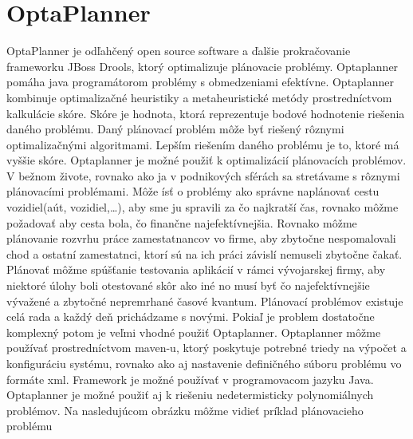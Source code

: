 \chapter{OptaPlanner}
OptaPlanner je odľahčený open source software a ďalšie prokračovanie frameworku JBoss Drools, ktorý optimalizuje plánovacie problémy. Optaplanner pomáha java programátorom problémy s obmedzeniami efektívne. Optaplanner kombinuje optimalizačné heuristiky a metaheuristické metódy prostredníctvom kalkulácie skóre. Skóre je hodnota, ktorá reprezentuje bodové hodnotenie riešenia daného problému. Daný plánovací problém môže byť riešený rôznymi optimalizačnými algoritmami. Lepším riešením daného problému je to, ktoré má vyššie skóre. Optaplanner je možné použiť k optimalizácií plánovacích problémov. V bežnom živote, rovnako ako ja v podnikových sférách sa stretávame s rôznymi plánovacími problémami. Môže ísť o problémy ako správne naplánovať cestu vozidiel(aút, vozidiel,\ldots), aby sme ju spravili za čo najkratší čas, rovnako môžme požadovať aby cesta bola, čo finančne najefektívnejšia. Rovnako môžme plánovanie rozvrhu práce zamestatnancov vo firme, aby zbytočne nespomalovali chod a ostatní zamestatnci, ktorí sú na ich práci závislí nemuseli zbytočne čakať. Plánovať môžme spúšťanie testovania aplikácií v rámci vývojarskej firmy, aby niektoré úlohy boli otestované skôr ako iné no musí byť čo najefektívnejšie vývažené a zbytočné nepremrhané časové kvantum. Plánovací problémov existuje celá rada a každý deň prichádzame s novými. Pokiaľ je problem dostatočne komplexný potom je veľmi vhodné použiť Optaplanner. Optaplanner môžme používať prostredníctvom maven-u, ktorý poskytuje potrebné triedy na výpočet a konfiguráciu systému, rovnako ako aj nastavenie definičného súboru problému vo formáte xml. Framework je možné používať v programovacom jazyku Java. Optaplanner je možné použiť aj k riešeniu nedetermisticky polynomiálnych problémov. Na nasledujúcom obrázku môžme vidieť príklad plánovacieho problému


